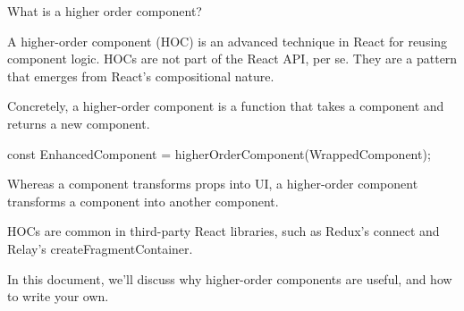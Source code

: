 What is a higher order component? 

A higher-order component (HOC) is an advanced technique in 
React for reusing component logic. HOCs are not part of the React API, per se. 
They are a pattern that emerges from React’s compositional nature.

Concretely, a higher-order component is a function that takes a 
component and returns a new component.

const EnhancedComponent = higherOrderComponent(WrappedComponent);

Whereas a component transforms props into UI, a higher-order 
component transforms a component into another component.

HOCs are common in third-party React libraries, such as 
Redux’s connect and Relay’s createFragmentContainer.

In this document, we’ll discuss why higher-order components are useful, 
and how to write your own.